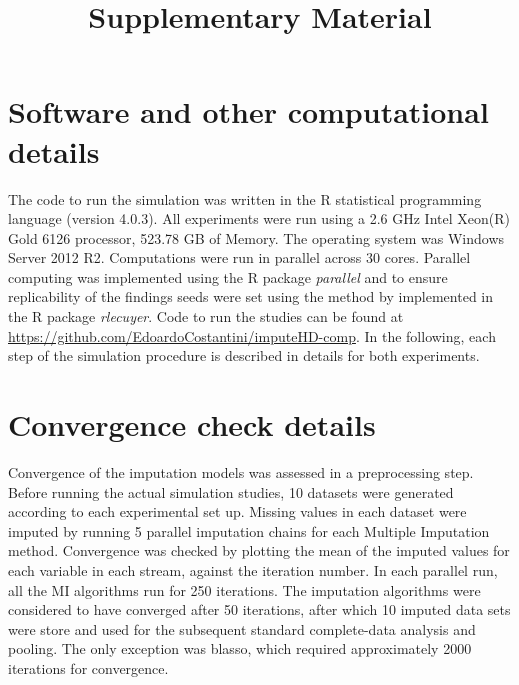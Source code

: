 \documentclass[11pt]{article}
\title{Supplementary Material}
\begin{document}
\maketitle

\section{Software and other computational details}

The code to run the simulation was written in the R statistical programming language (version 4.0.3). 
All experiments were run using a 2.6 GHz Intel Xeon(R) Gold 6126 processor, 523.78 GB of Memory. The
operating system was Windows Server 2012 R2.
Computations were run in parallel across 30 cores. 
Parallel computing was implemented using the R package \emph{parallel} and to ensure replicability 
of the findings seeds were set using the method by \cite{lecuyer:2002} implemented in the R package 
\emph{rlecuyer}.
Code to run the studies can be found at \url{https://github.com/EdoardoCostantini/imputeHD-comp}.
In the following, each step of the simulation procedure is described in details for both experiments.

\section{Convergence check details}

	Convergence of the imputation models was assessed in a preprocessing step.
	Before running the actual simulation studies, 10 datasets were generated according to each experimental set up.
	Missing values in each dataset were imputed by running 5 parallel imputation chains for each Multiple Imputation 
	method.
	Convergence was checked by plotting the mean of the imputed values for each variable in each stream, against the 
	iteration number.
	In each parallel run, all the MI algorithms run for 250 iterations.
	The imputation algorithms were considered to have converged after 50 iterations, after which 10 imputed data 
	sets were store and used for the subsequent standard complete-data analysis and pooling.
	The only exception was blasso, which required approximately 2000 iterations for convergence.
\end{document}
